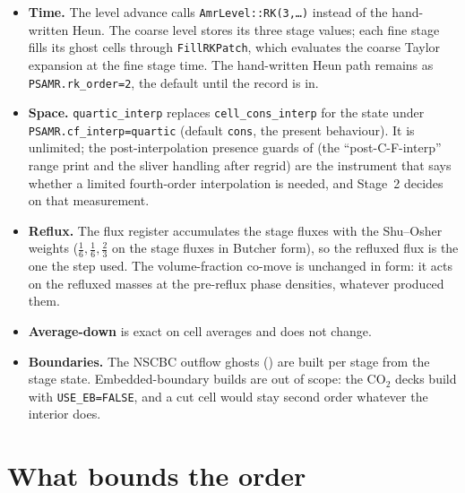 \documentclass[11pt,a4paper]{article}
\newcommand{\code}[1]{\texttt{\small #1}}
\begin{document}
\begin{itemize}[nosep]
\item \textbf{Time.}  The level advance calls \code{AmrLevel::RK(3,\dots)}
      instead of the hand-written Heun.  The coarse level stores its three
      stage values; each fine stage fills its ghost cells through
      \code{FillRKPatch}, which evaluates the coarse Taylor expansion at
      the fine stage time.  The hand-written Heun path remains as
      \code{PSAMR.rk\_order=2}, the default until the record is in.
\item \textbf{Space.}  \code{quartic\_interp} replaces
      \code{cell\_cons\_interp} for the state under
      \code{PSAMR.cf\_interp=quartic} (default \code{cons}, the present
      behaviour).  It is unlimited; the post-interpolation presence guards
      of  (the ``post-C-F-interp'' range print and the
      sliver handling after regrid) are the instrument that says whether a
      limited fourth-order interpolation is needed, and Stage~2 decides on
      that measurement.
\item \textbf{Reflux.}  The flux register accumulates the stage fluxes with
      the Shu--Osher weights ($\tfrac16,\tfrac16,\tfrac23$ on the
      stage fluxes in Butcher form), so the refluxed flux is the one the
      step used.  The volume-fraction co-move is unchanged in form: it acts
      on the refluxed masses at the pre-reflux phase densities, whatever
      produced them.
\item \textbf{Average-down} is exact on cell averages and does not change.
\item \textbf{Boundaries.}  The NSCBC outflow ghosts () are
      built per stage from the stage state.  Embedded-boundary builds are
      out of scope: the CO$_2$ decks build with \code{USE\_EB=FALSE}, and a
      cut cell would stay second order whatever the interior does.
\end{itemize}

\section{What bounds the order}
\label{sec:bounds}
\end{document}
